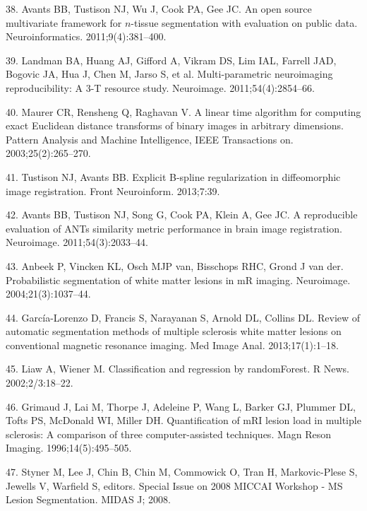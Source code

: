 \documentclass[11pt,]{article}
\begin{document}
\hypertarget{ref-Avants:2011aa}{}
38. Avants BB, Tustison NJ, Wu J, Cook PA, Gee JC. An open source
multivariate framework for \(n\)-tissue segmentation with evaluation on
public data. Neuroinformatics. 2011;9(4):381--400.

\hypertarget{ref-landman2011}{}
39. Landman BA, Huang AJ, Gifford A, Vikram DS, Lim IAL, Farrell JAD,
Bogovic JA, Hua J, Chen M, Jarso S, et al. Multi-parametric neuroimaging
reproducibility: A 3-T resource study. Neuroimage. 2011;54(4):2854--66.

\hypertarget{ref-maurer2003}{}
40. Maurer CR, Rensheng Q, Raghavan V. A linear time algorithm for
computing exact Euclidean distance transforms of binary images in
arbitrary dimensions. Pattern Analysis and Machine Intelligence, IEEE
Transactions on. 2003;25(2):265--270.

\hypertarget{ref-Tustison:2013ac}{}
41. Tustison NJ, Avants BB. Explicit B-spline regularization in
diffeomorphic image registration. Front Neuroinform. 2013;7:39.

\hypertarget{ref-Avants:2011ab}{}
42. Avants BB, Tustison NJ, Song G, Cook PA, Klein A, Gee JC. A
reproducible evaluation of ANTs similarity metric performance in brain
image registration. Neuroimage. 2011;54(3):2033--44.

\hypertarget{ref-Anbeek:2004aa}{}
43. Anbeek P, Vincken KL, Osch MJP van, Bisschops RHC, Grond J van der.
Probabilistic segmentation of white matter lesions in mR imaging.
Neuroimage. 2004;21(3):1037--44.

\hypertarget{ref-Garcia-Lorenzo:2013aa}{}
44. García-Lorenzo D, Francis S, Narayanan S, Arnold DL, Collins DL.
Review of automatic segmentation methods of multiple sclerosis white
matter lesions on conventional magnetic resonance imaging. Med Image
Anal. 2013;17(1):1--18.

\hypertarget{ref-liaw2002}{}
45. Liaw A, Wiener M. Classification and regression by randomForest. R
News. 2002;2/3:18--22.

\hypertarget{ref-Grimaud:1996aa}{}
46. Grimaud J, Lai M, Thorpe J, Adeleine P, Wang L, Barker GJ, Plummer
DL, Tofts PS, McDonald WI, Miller DH. Quantification of mRI lesion load
in multiple sclerosis: A comparison of three computer-assisted
techniques. Magn Reson Imaging. 1996;14(5):495--505.

\hypertarget{ref-styner2008}{}
47. Styner M, Lee J, Chin B, Chin M, Commowick O, Tran H, Markovic-Plese
S, Jewells V, Warfield S, editors. Special Issue on 2008 MICCAI Workshop
- MS Lesion Segmentation. MIDAS J; 2008.
\end{document}
